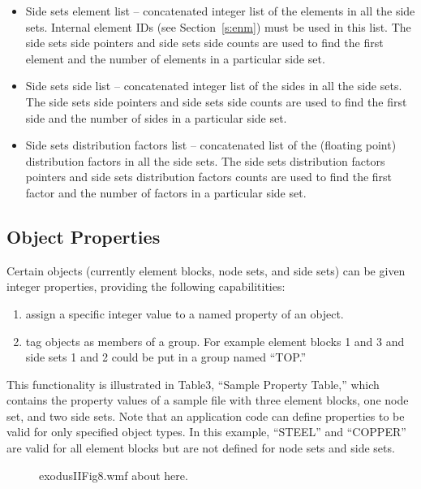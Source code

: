 \begin{itemize}
 \item {Side sets element list -- concatenated integer list of the
 elements in all the side sets.} {Internal element IDs (see
 Section~\ref{s:enm}) must be used in this list.} {The side sets side
 pointers and side sets side counts are used to find the first element
 and the number of elements in a particular side set.}

 \item {Side sets side list -- concatenated integer list of the sides
 in all the side sets. The side sets side pointers and side sets side
 counts are used to find the first side and the number of sides in a
 particular side set.}

 \item {Side sets distribution factors list -- concatenated list of
 the (floating point) distribution factors in all the side sets. The
 side sets distribution factors pointers and side sets distribution
 factors counts are used to find the first factor and the number of
 factors in a particular side set.}
\end{itemize}



\subsection{Object Properties}

Certain \exo{} objects (currently element blocks, node 
sets, and side sets) can be given integer properties, providing 
the following capabilitities:
\begin{enumerate}
\item assign a specific integer value to a named property of 
an object.

\item tag objects as members of a group. For example element 
blocks 1 and 3 and side sets 1 and 2 could be put in a group 
named ``TOP.''
\end{enumerate}

This functionality is illustrated in Table{\nobreakspace}3, ``Sample
Property Table,'' which contains the property values of a sample
\exo{} file with three element blocks, one node set, and two 
side sets. Note that an application code can define properties 
to be valid for only specified object types. In this example, 
``STEEL'' and ``COPPER'' are valid for all element blocks but are 
not defined for node sets and side sets. 

\begin{figure}[htbp]
\begin{center}
\caption{exodusIIFig8.wmf about here.}
\end{center}
\end{figure}



